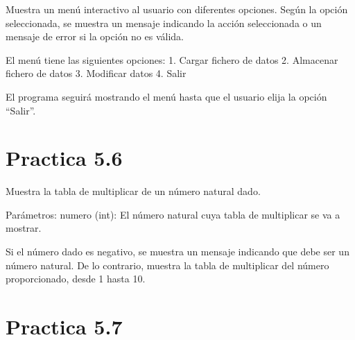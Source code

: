 \documentclass[letterpaper,10pt,spanish]{sphinxmanual}
\begin{document}
\begin{fulllineitems}
\label{\detokenize{pr5:pr5.5.menu_principal}}
\pysigstartsignatures
{}
\pysigstopsignatures
\sphinxAtStartPar
Muestra un menú interactivo al usuario con diferentes opciones. Según la opción seleccionada,
se muestra un mensaje indicando la acción seleccionada o un mensaje de error si la opción no es válida.

\sphinxAtStartPar
El menú tiene las siguientes opciones:
1. Cargar fichero de datos
2. Almacenar fichero de datos
3. Modificar datos
4. Salir

\sphinxAtStartPar
El programa seguirá mostrando el menú hasta que el usuario elija la opción “Salir”.

\end{fulllineitems}



\section{Practica 5.6}
\label{\detokenize{pr5:module-pr5.6}}\label{\detokenize{pr5:practica-5-6}}

\begin{fulllineitems}
\label{\detokenize{pr5:pr5.6.tabla_multiplicar}}
\pysigstartsignatures
{}
\pysigstopsignatures
\sphinxAtStartPar
Muestra la tabla de multiplicar de un número natural dado.

\sphinxAtStartPar
Parámetros:
numero (int): El número natural cuya tabla de multiplicar se va a mostrar.

\sphinxAtStartPar
Si el número dado es negativo, se muestra un mensaje indicando que debe ser un número natural.
De lo contrario, muestra la tabla de multiplicar del número proporcionado, desde 1 hasta 10.

\end{fulllineitems}



\section{Practica 5.7}
\label{\detokenize{pr5:module-pr5.7}}\label{\detokenize{pr5:practica-5-7}}
\end{document}

